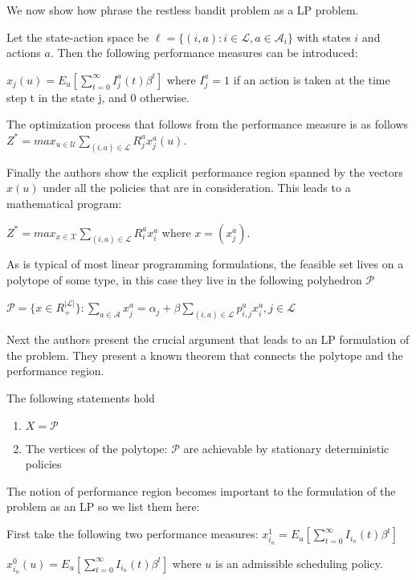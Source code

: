 We now show how \citep{bertsimas} phrase the restless bandit problem as a LP problem. 

Let the state-action space be  $\ell= \{(i,a): i \in \mathcal{L}, a \in  \mathcal{A}_i \}$
with states $i$ and actions $a$. Then the following performance measures can be introduced:

$x_j(u) = E_u[\sum_{t=0}^{\infty}I_j^a(t) \beta^t]$ where $I_j^a = 1$ if an action is taken at the time step t in the state j, and 0 otherwise. 

The optimization process that follows from the performance measure is as follows 
$Z^* = max_{u \in \mathcal{U}} \sum_{(i,a) \in \mathcal{L}} R_j^a x_j^a(u)$.  

Finally the authors show the explicit performance region spanned by the vectors $x(u)$ under all the policies that are in consideration. This leads to a mathematical program: 

$Z^* = max_{x \in \mathcal{X}}\sum_{(i,a)\in \mathcal{L}}R_i^a x_i^a$ where $x = (x_j^a)$. 

As is typical of most linear programming formulations, the feasible set lives on a polytope of some type, in this case they live in the following polyhedron $\mathcal {P}$ 

$\mathcal{P} = \{ x \in R_+^{|\mathcal{L}|} \}: \sum_{a \in \mathcal{A}} x_j^a = \alpha_j 
+ \beta \sum_{(i,a) \in \mathcal{L}} p_{i,j}^a x_i^a, j  \in \mathcal{L}$ 

Next the authors present the crucial argument that leads to an LP formulation of the problem.
They present a known theorem that connects the polytope and the performance region. 

The following statements hold
\begin{enumerate}
\item
 $X = \mathcal{P}$ \\
\item
  The vertices of the polytope: $\mathcal{P}$ are achievable by stationary 
deterministic policies
\end{enumerate} 

The notion of performance region becomes important to the formulation of the problem as an
LP so we list them here:

First take the following two performance measures:
$x_{i_n}^1 = E_u[\sum_{t=0}^{\infty} I_{i_n}(t)\beta^t]$ 

$x_{i_n}^0(u) = E_u[\sum_{t=0}^{\infty}I_{i_n}(t) \beta^t]$ where $u$ is an admissible scheduling policy.  \\

